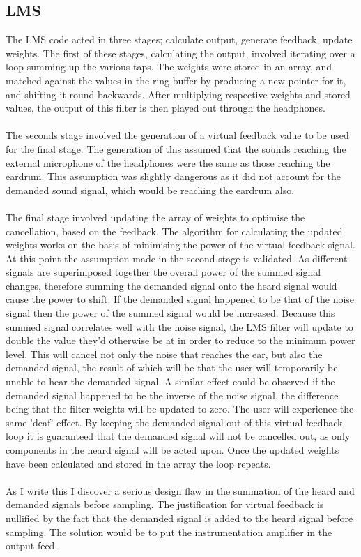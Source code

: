 \subsection{LMS}
\label{ssec:implelms}
The LMS code acted in three stages; calculate output, generate feedback, update weights.
The first of these stages, calculating the output, involved iterating over a loop summing up the various taps.
The weights were stored in an array, and matched against the values in the ring buffer by producing a new pointer for it, and shifting it round backwards.
After multiplying respective weights and stored values, the output of this filter is then played out through the headphones.
\\
\\
The seconds stage involved the generation of a virtual feedback value to be used for the final stage.
The generation of this assumed that the sounds reaching the external microphone of the headphones were the same as those reaching the eardrum.
This assumption was slightly dangerous as it did not account for the demanded sound signal, which would be reaching the eardrum also.
\\
\\
The final stage involved updating the array of weights to optimise the cancellation, based on the feedback.
The algorithm for calculating the updated weights works on the basis of minimising the power of the virtual feedback signal.
At this point the assumption made in the second stage is validated.
As different signals are superimposed together the overall power of the summed signal changes, therefore summing the demanded signal onto the heard signal would cause the power to shift.
If the demanded signal happened to be that of the noise signal then the power of the summed signal would be increased.
Because this summed signal correlates well with the noise signal, the LMS filter will update to double the value they'd otherwise be at in order to reduce to the minimum power level.
This will cancel not only the noise that reaches the ear, but also the demanded signal, the result of which will be that the user will temporarily be unable to hear the demanded signal.
A similar effect could be observed if the demanded signal happened to be the inverse of the noise signal, the difference being that the filter weights will be updated to zero.
The user will experience the same 'deaf' effect.
By keeping the demanded signal out of this virtual feedback loop it is guaranteed that the demanded signal will not be cancelled out, as only components in the heard signal will be acted upon.
Once the updated weights have been calculated and stored in the array the loop repeats.
\\
\\
As I write this I discover a serious design flaw in the summation of the heard and demanded signals before sampling.
The justification for virtual feedback is nullified by the fact that the demanded signal is added to the heard signal before sampling.
The solution would be to put the instrumentation amplifier in the output feed.
